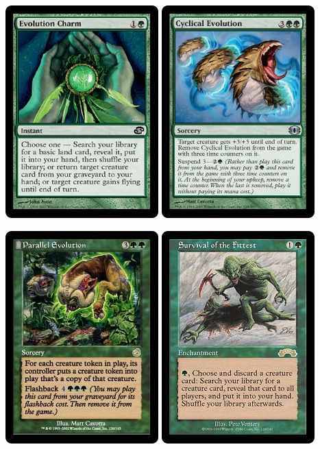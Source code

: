 \documentclass[12pt,a4paper]{article}
\begin{document}
\begin{center}
			\includegraphics{charm} \includegraphics{cyclical}

			\includegraphics{parallel} \includegraphics{survival}


\end{center}
\end{document}
